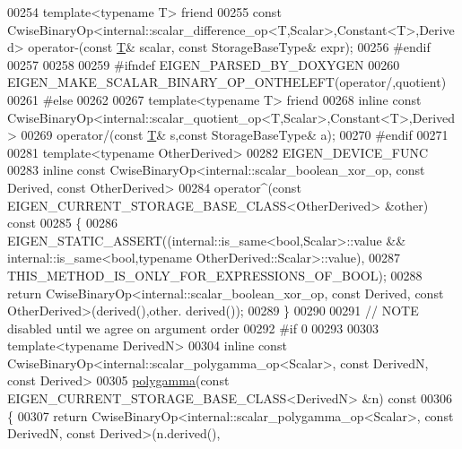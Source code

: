 \begin{DoxyCode}
00254 \textcolor{keyword}{template}<\textcolor{keyword}{typename} T> \textcolor{keyword}{friend}
00255 \textcolor{keyword}{const} CwiseBinaryOp<internal::scalar\_difference\_op<T,Scalar>,Constant<T>,Derived> operator-(\textcolor{keyword}{const} 
      \hyperlink{group___sparse_core___module_class_eigen_1_1_triplet}{T}& scalar, \textcolor{keyword}{const} StorageBaseType& expr);
00256 \textcolor{preprocessor}{#endif}
00257 
00258 
00259 \textcolor{preprocessor}{#ifndef EIGEN\_PARSED\_BY\_DOXYGEN}
00260   EIGEN\_MAKE\_SCALAR\_BINARY\_OP\_ONTHELEFT(\textcolor{keyword}{operator}/,quotient)
00261 \textcolor{preprocessor}{#else}
00262 
00267   \textcolor{keyword}{template}<\textcolor{keyword}{typename} T> \textcolor{keyword}{friend}
00268   \textcolor{keyword}{inline} \textcolor{keyword}{const} CwiseBinaryOp<internal::scalar\_quotient\_op<T,Scalar>,Constant<T>,Derived>
00269   operator/(\textcolor{keyword}{const} \hyperlink{group___sparse_core___module_class_eigen_1_1_triplet}{T}& s,\textcolor{keyword}{const} StorageBaseType& a);
00270 \textcolor{preprocessor}{#endif}
00271 
00281 \textcolor{keyword}{template}<\textcolor{keyword}{typename} OtherDerived>
00282 EIGEN\_DEVICE\_FUNC
00283 \textcolor{keyword}{inline} \textcolor{keyword}{const} CwiseBinaryOp<internal::scalar\_boolean\_xor\_op, const Derived, const OtherDerived>
00284 operator^(\textcolor{keyword}{const} EIGEN\_CURRENT\_STORAGE\_BASE\_CLASS<OtherDerived> &other)\textcolor{keyword}{ const}
00285 \textcolor{keyword}{}\{
00286   EIGEN\_STATIC\_ASSERT((internal::is\_same<bool,Scalar>::value && internal::is\_same<bool,typename
       OtherDerived::Scalar>::value),
00287                       THIS\_METHOD\_IS\_ONLY\_FOR\_EXPRESSIONS\_OF\_BOOL);
00288   \textcolor{keywordflow}{return} CwiseBinaryOp<internal::scalar\_boolean\_xor\_op, const Derived, const OtherDerived>(derived(),other.
      derived());
00289 \}
00290 
00291 \textcolor{comment}{// NOTE disabled until we agree on argument order}
00292 \textcolor{preprocessor}{#if 0}
00293 
00303 \textcolor{keyword}{template}<\textcolor{keyword}{typename} DerivedN>
00304 \textcolor{keyword}{inline} \textcolor{keyword}{const} CwiseBinaryOp<internal::scalar\_polygamma\_op<Scalar>, \textcolor{keyword}{const} DerivedN, \textcolor{keyword}{const} Derived>
00305 \hyperlink{namespace_eigen_ae3b47a13a0699f5dbaa0623c11333dca}{polygamma}(\textcolor{keyword}{const} EIGEN\_CURRENT\_STORAGE\_BASE\_CLASS<DerivedN> &n)\textcolor{keyword}{ const}
00306 \textcolor{keyword}{}\{
00307   \textcolor{keywordflow}{return} CwiseBinaryOp<internal::scalar\_polygamma\_op<Scalar>, \textcolor{keyword}{const} DerivedN, \textcolor{keyword}{const} Derived>(n.derived(), 

\end{DoxyCode}
